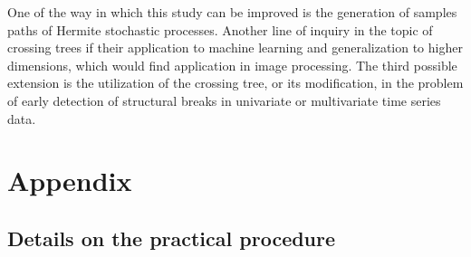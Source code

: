 \documentclass[a4paper]{article}
\begin{document}
One of the way in which this study can be improved is the generation of samples paths
of Hermite stochastic processes. Another line of inquiry in the topic of crossing trees
if their application to machine learning and generalization to higher dimensions, which
would find application in image processing. The third possible extension is the utilization
of the crossing tree, or its modification, in the problem of early detection of structural
breaks in univariate or multivariate time series data.





\section*{Appendix} %
\label{sec:appendix}

\subsection*{Details on the practical procedure} %
\label{sub:details_on_the_practical_procedure}


\end{document}
